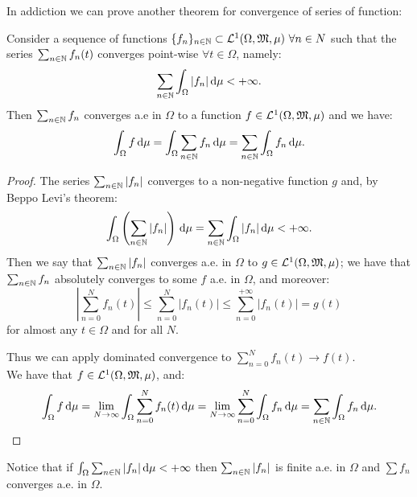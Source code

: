 In addiction we can prove another theorem for convergence of series of function:

\begin{theo}
	Consider a sequence of functions $\{f_n\}_{n \in \mathbb N} \subset \mathcal L^1(\Omega, \mathfrak M, \mu) \ \forall n \in N$ such that the series $\sum_{n \in \mathbb N} f_n(t)$ converges point-wise $\forall t \in \Omega$, namely:
	$$\sum_{n\in \mathbb N} \int_\Omega|f_n| \,\mathrm d\mu < +\infty.$$
	Then $\sum_{n\in\mathbb N} f_n$ converges a.e in $\Omega$ to a function $f\in \mathcal L^1(\Omega, \mathfrak M, \mu)$ and we have:
	$$\int_\Omega f \,\mathrm d\mu 
	= \int_\Omega \sum_{n \in \mathbb N} f_n \, \mathrm d \mu 
	= \sum_{n\in \mathbb N} \int_\Omega f_n \,\mathrm d\mu.$$
\end{theo}
\begin{proof}
	The series $\sum_{n\in \mathbb N}|f_n|$ converges to a non-negative function $g$ and, by Beppo Levi's theorem:
	$$ \int_\Omega \left(\sum_{n\in \mathbb N} |f_n|\right) \,\mathrm d\mu = \sum_{n\in \mathbb N} \int_\Omega |f_n| \,\mathrm d\mu < +\infty.$$
	Then we say that $\sum_{n\in \mathbb N} |f_n|$ converges a.e. in $\Omega$ to $g \in \mathcal L^1(\Omega, \mathfrak M, \mu)$;	we have that $\sum_{n\in \mathbb N} f_n$ absolutely converges to some $f$ a.e. in $\Omega$, and moreover:
	$$
		\left| \sum_{n=0}^N f_n (t) \right|
		\leq \sum_{n=0}^N |f_n (t)|
		\leq \sum_{n=0}^{+\infty} |f_n (t)|
		= g(t)
	$$
	for almost any $t \in \Omega$ and for all $N$.
	
	Thus we can apply dominated convergence to $\sum_{n=0}^N f_n(t) \to f(t)$. \\
	We have that $f\in \mathcal L^1(\Omega, \mathfrak M, \mu)$, and:
	$$
		\int_\Omega f \,\mathrm d\mu
		= \lim\limits_{N \to \infty} \int_\Omega \sum_{n=0}^N f_n(t) \,\mathrm d\mu
		= \lim\limits_{N \to \infty} \sum_{n=0}^N \int_\Omega f_n \,\mathrm d\mu
		= \sum_{n\in\mathbb N} \int_\Omega f_n \,\mathrm d\mu
	.
	$$
\end{proof}
Notice that if $\int_\Omega \sum_{n \in \mathbb N} |f_n| \,\mathrm d\mu < +\infty$ then $\sum_{n \in \mathbb N} |f_n|$ is finite a.e. in $\Omega$ and $\sum f_n$ converges a.e. in $\Omega$.

